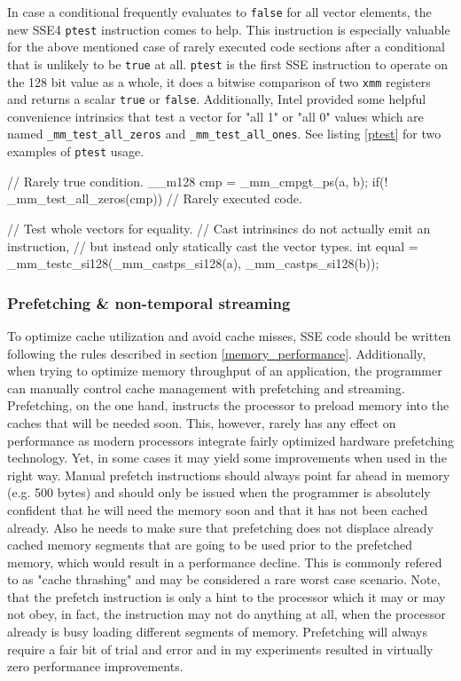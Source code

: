 In case a conditional frequently evaluates to \texttt{false} for all vector elements, the new SSE4 \texttt{ptest} instruction comes to help. This instruction is especially valuable for the above mentioned case of rarely executed code sections after a conditional that is unlikely to be \texttt{true} at all. \texttt{ptest} is the first SSE instruction to operate on the 128 bit value as a whole, it does a bitwise comparison of two \texttt{xmm} registers and returns a scalar \texttt{true} or \texttt{false}. Additionally, Intel provided some helpful convenience intrinsics that test a vector for "all 1" or "all 0" values which are named \texttt{\_mm\_test\_all\_zeros} and \texttt{\_mm\_test\_all\_ones}. See listing \ref{ptest} for two examples of \texttt{ptest} usage.

\begin{code}[caption={Examples of \texttt{ptest} usage},label=ptest]
// Rarely true condition.
__m128 cmp = _mm_cmpgt_ps(a, b);
if(! _mm_test_all_zeros(cmp)) {
  // Rarely executed code.
}

// Test whole vectors for equality.
// Cast intrinsincs do not actually emit an instruction,
// but instead only statically cast the vector types.
int equal = _mm_testc_si128(_mm_castps_si128(a), _mm_castps_si128(b));
\end{code}

\subsubsection{Prefetching \& non-temporal streaming}

To optimize cache utilization and avoid cache misses, SSE code should be written following the rules described in section \ref{memory_performance}. Additionally, when trying to optimize memory throughput of an application, the programmer can manually control cache management with prefetching and streaming. Prefetching, on the one hand, instructs the processor to preload memory into the caches that will be needed soon. This, however, rarely has any effect on performance as modern processors integrate fairly optimized hardware prefetching technology. Yet, in some cases it may yield some improvements when used in the right way. Manual prefetch instructions should always point far ahead in memory (e.g. 500 bytes) and should only be issued when the programmer is absolutely confident that he will need the memory soon and that it has not been cached already. Also he needs to make sure that prefetching does not displace already cached memory segments that are going to be used prior to the prefetched memory, which would result in a performance decline. This is commonly refered to as "cache thrashing" and may be considered a rare worst case scenario. Note, that the prefetch instruction is only a hint to the processor which it may or may not obey, in fact, the instruction may not do anything at all, when the processor already is busy loading different segments of memory. Prefetching will always require a fair bit of trial and error and in my experiments resulted in virtually zero performance improvements.

